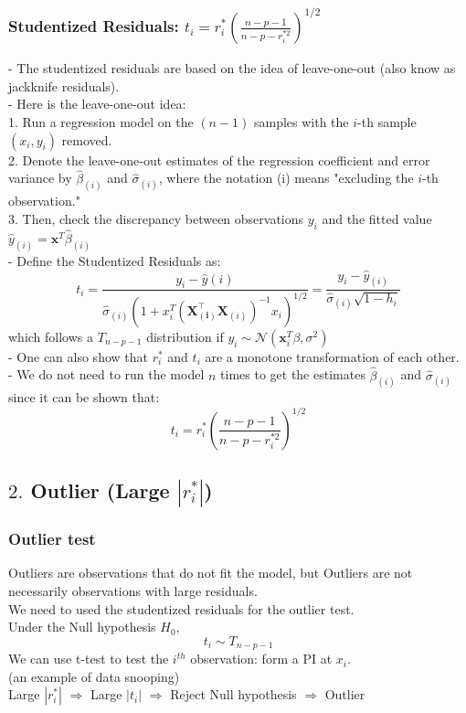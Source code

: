 \documentclass[11pt,a4paper]{article}
\begin{document}
\subsubsection{Studentized Residuals: $
t_{i}=r_{i}^{*}\left(\frac{n-p-1}{n-p-r_{i}^{* 2}}\right)^{1 / 2}
$}
- The studentized residuals are based on the idea of leave-one-out (also know as jackknife residuals).\\
- Here is the leave-one-out idea:\\
1. Run a regression model on the $(n-1)$ samples with the $i$-th sample $\left(x_{i}, y_{i}\right)$ removed.\\
2. Denote the leave-one-out estimates of the regression coefficient and error variance by $\hat{\beta}_{(i)}$ and $\hat{\sigma}_{(i)}$, where the notation (i) means "excluding the $i$-th observation."\\
3. Then, check the discrepancy between observations $y_{i}$ and the fitted value $\hat{y}_{(i)}=\mathbf{x}^{T} \hat{\beta}_{(i)}$\\
- Define the Studentized Residuals as:
$$
t_{i}=\frac{y_{i}-\hat{y}(i)}{\hat{\sigma}_{(i)}\left(1+x_{i}^{T}\left(\mathbf{X}_{(\mathbf{i})}^{\top} \mathbf{X}_{(i)}\right)^{-1} x_{i}\right)^{1 / 2}}=\frac{y_{i}-\hat{y}_{(i)}}{\hat{\sigma}_{(i)} \sqrt{1-h_{i}}}
$$
which follows a $T_{n-p-1}$ distribution if $y_{i} \sim \mathcal{N}\left(\mathbf{x}_{i}^{T} \beta, \sigma^{2}\right)$\\
- One can also show that $r_{i}^{*}$ and $t_{i}$ are a monotone transformation of each other.\\
- We do not need to run the model $n$ times to get the estimates $\hat{\beta}_{(i)}$ and $\hat{\sigma}_{(i)}$ since it can be shown that:
$$
t_{i}=r_{i}^{*}\left(\frac{n-p-1}{n-p-r_{i}^{* 2}}\right)^{1 / 2}
$$

\subsection{ $2.$ Outlier (Large $|r_i^*|$)}
\subsubsection{Outlier test}
Outliers are observations that do not ﬁt the model, but Outliers are not necessarily observations with large residuals.\\
We need to used the studentized residuals for the outlier test.\\
Under the Null hypothesis $H_0$,
$$t_i\sim T_{n-p-1}$$
We can use t-test to test the $i^{th}$ observation: form a PI at $x_i$.\\
(an example of data snooping)\\
Large $|r_i^*|$ $\Rightarrow$ Large $|t_i|$ $\Rightarrow$ Reject Null hypothesis $\Rightarrow$ Outlier
\end{document}
